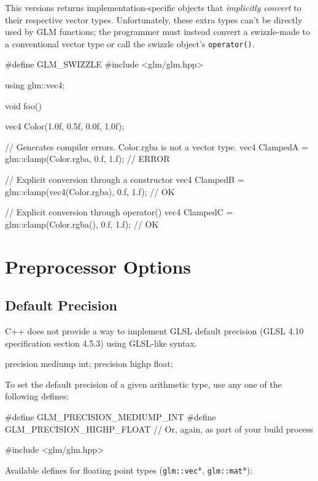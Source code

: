 \documentclass{scrartcl}
\numberwithin{figure}{subsection}
\begin{document}
This versions returns implementation-specific objects that \emph{implicitly convert} to their respective vector types.  Unfortunately, these extra types can't be directly used by GLM functions; the programmer must instead convert a swizzle-made  to a conventional vector type or call the swizzle object's \verb|operator()|.

\begin{cppcode}
#define GLM_SWIZZLE 
#include <glm/glm.hpp>

using glm::vec4;

void foo()
{
  vec4 Color(1.0f, 0.5f, 0.0f, 1.0f);

  // Generates compiler errors. Color.rgba is not a vector type.
  vec4 ClampedA = glm::clamp(Color.rgba, 0.f, 1.f); // ERROR 

  // Explicit conversion through a constructor
  vec4 ClampedB = glm::clamp(vec4(Color.rgba), 0.f, 1.f); // OK

  // Explicit conversion through operator()
  vec4 ClampedC = glm::clamp(Color.rgba(), 0.f, 1.f); // OK
}
\end{cppcode}

\newpage{}

\section{Preprocessor Options}

\subsection{Default Precision}
C++ does not provide a way to implement GLSL default precision (GLSL 4.10 specification section 4.5.3) using GLSL-like syntax.

\begin{glslcode}
precision mediump int;
precision highp float;
\end{glslcode}

To set the default precision of a given arithmetic type, use any one of the following defines:

\begin{cppcode}
#define GLM_PRECISION_MEDIUMP_INT
#define GLM_PRECISION_HIGHP_FLOAT
// Or, again, as part of your build process

#include <glm/glm.hpp>
\end{cppcode}

Available defines for floating point types (\verb|glm::vec|*, \verb|glm::mat|*):
\end{document}
